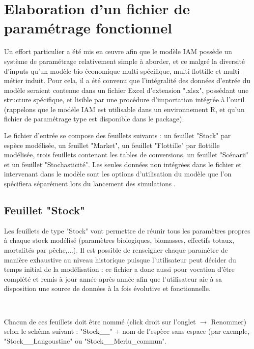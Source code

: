 \documentclass[12pt, colorinlistoftodos, notitlepage]{report}
\newenvironment{not used}[1]{%
    \longtable{%
        |>{\centering$\displaystyle}A{#1}{1}<{$}%
        |}\hline\ignorespaces}{%
    \endlongtable\ignorespacesafterend}
\begin{document}
\chapter{Elaboration d'un fichier de paramétrage fonctionnel} \label{chp:param}

Un effort particulier a été mis en œuvre afin que le modèle IAM possède un système de paramétrage relativement simple à aborder, et ce malgré la diversité d'inputs qu'un modèle bio-économique multi-spécifique, multi-flottille et multi-métier induit. Pour cela, il a été convenu que l'intégralité des données d'entrée du modèle seraient contenue dans un fichier Excel d'extension ".xlsx", possédant une structure spécifique, et lisible par une procédure d'importation intégrée à l'outil (rappelons que le modèle IAM est utilisable dans un environnement R, et qu'un fichier de paramétrage type est disponible dans le package).
	
Le fichier d'entrée se compose des feuillets suivants : un feuillet "Stock" par espèce modélisée, un feuillet "Market", un feuillet "Flottille" par flottille modélisée, trois feuillets contenant les tables de conversions, un feuillet "Scénarii" et un feuillet "Stochasticité". Les seules données non intégrées dans le fichier et intervenant dans le modèle sont les options d'utilisation du modèle que l'on spécifiera séparément lors du lancement des simulations .	

\section{Feuillet "Stock"} \label{sec:stock}

Les feuillets de type "Stock" vont permettre de réunir tous les paramètres propres à chaque stock modélisé (paramètres biologiques, biomasses, effectifs totaux, mortalités par pêche,...). Il est possible de renseigner chaque paramètre de manière exhaustive au niveau historique puisque l'utilisateur peut décider du temps initial de la modélisation : ce fichier a donc aussi pour vocation d'être complété et remis à jour année après année afin que l'utilisateur aie à sa disposition une source de données à la fois évolutive et fonctionnelle.

\par~\par

Chacun de ces feuillets doit être nommé (click droit sur l'onglet $ \to $ Renommer) selon le schéma suivant : "Stock\_\_" + nom de l'espèce sans espace (par exemple, "Stock\_\_Langoustine" ou "Stock\_\_Merlu\_commun".
\end{document}
